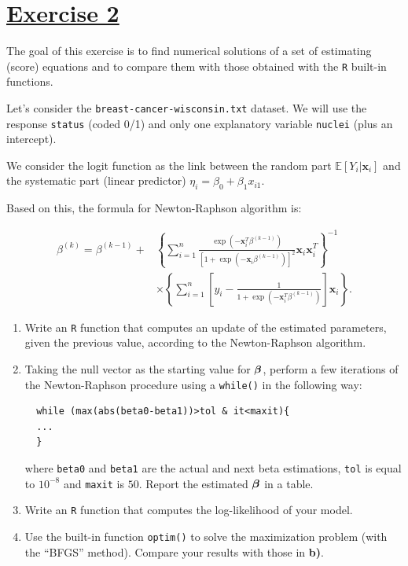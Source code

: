 \documentclass[a4paper,12pt]{article}\usepackage[]{graphicx}\usepackage[]{color}
\def\bx{\mathbf{x}}
\def\bbeta{\mbox{\boldmath $\beta$}}
\def\op{\left(}
\def\cp{\right)}
\def\oc{\left[}
\def\cc{\right]}
\def\ok{\left\{}
\def\ck{\right\}}
\def\exE{\mathbb{E}}
\begin{document}
\section{\underline{Exercise 2}}

The goal of this exercise is to find numerical solutions of a set of estimating (score) equations and to compare them with those obtained with the \texttt{R} built-in functions.

Let's consider the \verb"breast-cancer-wisconsin.txt" dataset. We will use the response \verb"status" (coded 0/1) and only one explanatory variable  \verb"nuclei" (plus an intercept). 

We consider the logit function as the link between the random part $\exE[Y_i | \bx_i]$ and the systematic part (linear predictor) $\eta_i=\beta_0 + \beta_1 x_{i1}$.

Based on this, the formula for Newton-Raphson algorithm is:

\begin{align*}
\beta^{(k)}=
\beta^{(k-1)} +& 
\ok 
\sum_{i=1}^n 
\frac{\exp \op - \bx_i^T \beta^{(k-1)} \cp}{\oc 1 + \exp\op -\bx_i\beta^{(k-1)}\cp \cc ^2} 
\bx_i\bx_i^T
\ck ^ {-1}\\
&\times
\ok
\sum_{i=1}^n 
\oc 
y_i - \frac{1}{1 + \exp \op -\bx_i^T\beta^{(k-1)} \cp} 
\cc 
\bx_i 
\ck.
\end{align*}

\begin{enumerate}
  \item{Write an \texttt{R} function that computes an update of the estimated parameters, given the previous value, according to the Newton-Raphson algorithm.}
  \item\label{manually}{Taking the null vector as the starting value for $\bbeta$, perform a few iterations of the Newton-Raphson procedure using a \texttt{while()} in the following way:
  
  \begin{verbatim}
  while (max(abs(beta0-beta1))>tol & it<maxit){
  ...
  }
\end{verbatim}
  


where \texttt{beta0} and \texttt{beta1} are the actual and next beta estimations, \texttt{tol} is equal to $10^{-8}$ and \texttt{maxit} is $50$. Report the estimated $\bbeta$ in a table.}
  \item{Write an \texttt{R} function that computes the log-likelihood of your model.}
  \item{Use the built-in function \verb"optim()" to solve the maximization problem (with the ``BFGS'' method). Compare your results with those in \textbf{b)}.}
\end{enumerate}
\end{document}
